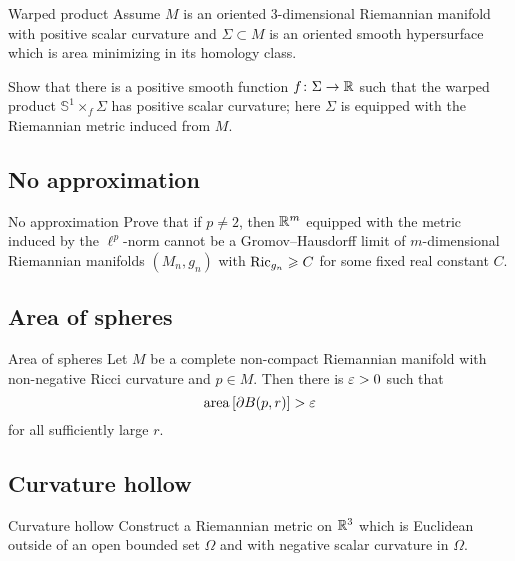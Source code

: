 \begin{pr}{}{Warped product}\label{Warped product}
Assume $M$ is an oriented 3-dimensional Riemannian manifold with positive scalar curvature 
and $\Sigma\subset M$ is an oriented smooth hypersurface which is area minimizing in its homology class.

Show that there is a positive smooth function $f\colon\Sigma\to \mathbb{R}$
such that the warped product $\mathbb S^1\times_f \Sigma$
has positive scalar curvature;
here $\Sigma$ is equipped with the Riemannian metric
induced from $M$.
\end{pr}

\subsection*{No approximation\many}

\begin{pr}{\many}{No approximation}\label{No approximation}
Prove that 
if $p\not=2$,
then $\mathbb{R}^m$ 
equipped with the metric induced by the $\ell^p$-norm 
cannot be a
Gromov--Hausdorff limit of
$m$-dimensional Riemannian manifolds $(M_n,g_n)$ with $\Ric_{g_n}\z\ge C$ for some fixed real constant $C$.
\end{pr}

\subsection*{Area of spheres}

\begin{pr}{}{Area of spheres}\label{Area of spheres}
Let $M$ be a complete non-compact Riemannian manifold 
with non-negative Ricci curvature and $p\in M$.
Then there is $\varepsilon>0$ such that 
$$\operatorname{\rm area}\left[\partial B(p,r)\right]>\varepsilon$$
for all sufficiently large $r$.
\end{pr}

\subsection*{Curvature hollow}

\begin{pr}{}{Curvature hollow}\label{Curvature hollow}
Construct a Riemannian metric on $\mathbb{R}^3$ 
which is Euclidean outside of an open bounded set $\Omega$ 
and with negative scalar curvature in $\Omega$.
\end{pr}

